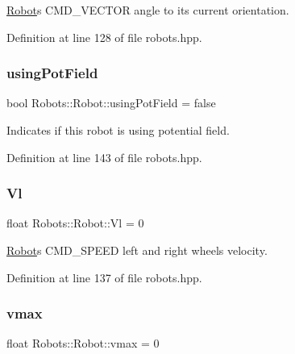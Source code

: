 \hyperlink{struct_robots_1_1_robot}{Robot}\textquotesingle{}s C\+M\+D\+\_\+\+V\+E\+C\+T\+OR angle to its current orientation. 



Definition at line 128 of file robots.\+hpp.

\mbox{\label{struct_robots_1_1_robot_af1e1627b59f42d4b49db7a46c9c04389}} 
\subsubsection{\texorpdfstring{using\+Pot\+Field}{usingPotField}}
{\footnotesize\ttfamily bool Robots\+::\+Robot\+::using\+Pot\+Field = false}



Indicates if this robot is using potential field. 



Definition at line 143 of file robots.\+hpp.

\mbox{\label{struct_robots_1_1_robot_aa0bc346c181a40b29735bfec12d94ca7}} 
\subsubsection{\texorpdfstring{Vl}{Vl}}
{\footnotesize\ttfamily float Robots\+::\+Robot\+::\+Vl = 0}



\hyperlink{struct_robots_1_1_robot}{Robot}\textquotesingle{}s C\+M\+D\+\_\+\+S\+P\+E\+ED left and right wheel\textquotesingle{}s velocity. 



Definition at line 137 of file robots.\+hpp.

\mbox{\label{struct_robots_1_1_robot_a348bcae40a653cce3fd9fe42746d1bb8}} 
\subsubsection{\texorpdfstring{vmax}{vmax}}
{\footnotesize\ttfamily float Robots\+::\+Robot\+::vmax = 0}



